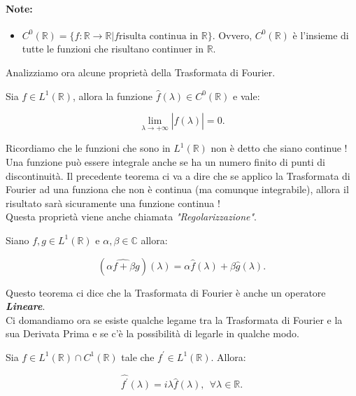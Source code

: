 \paragraph{Note:}
\begin{itemize}
    \item $C^0(\mathbb{R}) = \{ f: \mathbb{R} \rightarrow \mathbb{R} | f \text{
                  risulta continua in } \mathbb{R} \}$. Ovvero, $C^0(\mathbb{R})$ è
          l'insieme di tutte le funzioni che risultano continuer in
          $\mathbb{R}$.
\end{itemize}

Analizziamo ora alcune proprietà della Trasformata di Fourier.

\begin{theorem}
    Sia $f \in L^1(\mathbb{R})$, allora la funzione $\hat{f}(\lambda) \in
        C^0(\mathbb{R})$ e vale:

    $$
        \lim_{\lambda \rightarrow +\infty} \left| \hat{f}(\lambda) \right| = 0.
    $$
\end{theorem}

Ricordiamo che le funzioni che sono in $L^1(\mathbb{R})$ non è detto che siano
continue ! Una funzione può essere integrale anche se ha un numero finito di
punti di discontinuità. Il precedente teorema ci va a dire che se applico la
Trasformata di Fourier ad una funziona che non è continua (ma comunque
integrabile), allora il risultato sarà sicuramente una funzione continua !\\
Questa proprietà viene anche chiamata \textit{"Regolarizzazione"}.

\begin{theorem}
    Siano $f, g \in L^1(\mathbb{R})$ e $\alpha, \beta \in \mathbb{C}$ allora:

    $$
        (\widehat{ \alpha f + \beta g })(\lambda) = \alpha \hat{f}(\lambda) + \beta \hat{g}(\lambda).
    $$
\end{theorem}

Questo teorema ci dice che la Trasformata di Fourier è anche un operatore
\textbf{\textit{Lineare}}.\\

Ci domandiamo ora se esiste qualche legame tra la Trasformata di Fourier e la
sua Derivata Prima e se c'è la possibilità di legarle in qualche modo.

\begin{theorem}
    Sia $f \in L^1(\mathbb{R}) \cap C^1(\mathbb{R})$ tale che $f^{\prime} \in
        L^1(\mathbb{R})$. Allora:

    $$
        \widehat{f^{\prime}}(\lambda) = i \lambda \hat{f}(\lambda), \ \ \forall \lambda \in \mathbb{R}.
    $$
\end{theorem}

